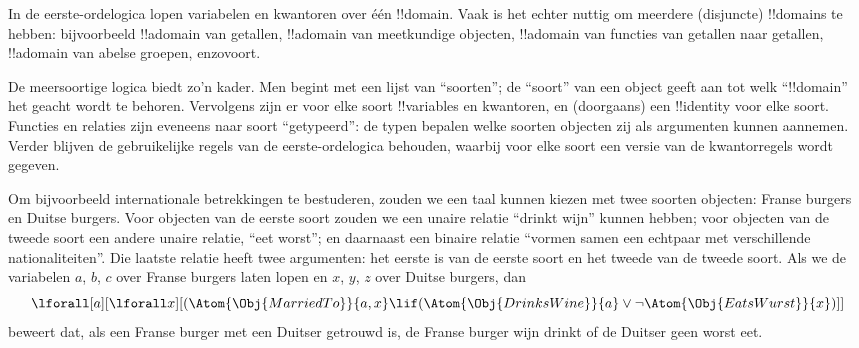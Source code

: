 \documentclass[../../../include/open-logic-section]{subfiles}
\begin{document}


In de eerste-ordelogica lopen variabelen en kwantoren over één
!!{domain}. Vaak is het echter nuttig om meerdere (disjuncte)
!!{domain}s te hebben: bijvoorbeeld !!a{domain} van getallen,
!!a{domain} van meetkundige objecten, !!a{domain} van functies van
getallen naar getallen, !!a{domain} van abelse groepen, enzovoort.

De meersoortige logica biedt zo'n kader. Men begint met een lijst van
``soorten''; de ``soort'' van een object geeft aan tot welk
``!!{domain}'' het geacht wordt te behoren. Vervolgens zijn er voor
elke soort !!{variable}s en kwantoren, en (doorgaans) een
!!{identity} voor elke soort. Functies en relaties zijn eveneens naar
soort ``getypeerd'': de typen bepalen welke soorten objecten zij als
argumenten kunnen aannemen. Verder blijven de gebruikelijke regels
van de eerste-ordelogica behouden, waarbij voor elke soort een versie
van de kwantorregels wordt gegeven.

Om bijvoorbeeld internationale betrekkingen te bestuderen, zouden we
een taal kunnen kiezen met twee soorten objecten: Franse burgers en
Duitse burgers. Voor objecten van de eerste soort zouden we een unaire
relatie ``drinkt wijn'' kunnen hebben; voor objecten van de tweede
soort een andere unaire relatie, ``eet worst''; en daarnaast een
binaire relatie ``vormen samen een echtpaar met verschillende
nationaliteiten''. Die laatste relatie heeft twee argumenten: het
eerste is van de eerste soort en het tweede van de tweede soort. Als
we de variabelen $a$, $b$, $c$ over Franse burgers laten lopen en $x$, $y$, $z$
over Duitse burgers, dan
\[
\lforall[a][\lforall x][(\Atom{\Obj{MarriedTo}}{a,x} \lif
(\Atom{\Obj{DrinksWine}}{a} \lor \lnot \Atom{\Obj{EatsWurst}}{x})]]
\]
beweert dat, als een Franse burger met een Duitser getrouwd is, de
Franse burger wijn drinkt of de Duitser geen worst eet.
\end{document}
